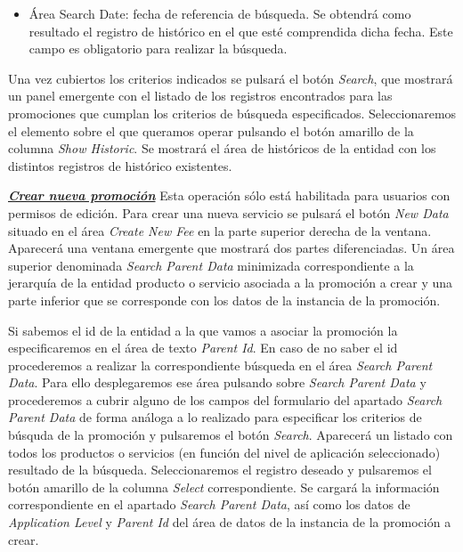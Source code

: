 \begin{itemize}
\begin{itemize}
	\end{itemize}	    	
	\item Área Search Date: fecha de referencia de búsqueda. Se obtendrá como resultado el registro de histórico en el que esté comprendida dicha fecha. Este campo es obligatorio para realizar la búsqueda.
\end{itemize}

Una vez cubiertos los criterios indicados se pulsará el botón \emph{Search}, que mostrará un panel emergente con el listado de los registros encontrados para las promociones que cumplan los criterios de búsqueda especificados. Seleccionaremos el elemento sobre el que queramos operar pulsando el botón amarillo de la columna \emph{Show Historic}. Se mostrará el área de históricos de la entidad con los distintos registros de histórico existentes.


\underline{\textsl{\textbf{Crear nueva promoción}}}\newline
Esta operación sólo está habilitada para usuarios con permisos de edición.
Para crear una nueva servicio se pulsará el botón \textit{New Data} situado en el área \emph{Create New Fee} en la parte superior derecha de la ventana. Aparecerá una ventana emergente que mostrará dos partes diferenciadas. Un área superior denominada \emph{Search Parent Data} minimizada correspondiente a la jerarquía de la entidad producto o servicio asociada a la promoción a crear y una parte inferior que se corresponde con los datos de la instancia de la promoción.

Si sabemos el id de la entidad a la que vamos a asociar la promoción la especificaremos en el área de texto \emph{Parent Id}. En caso de no saber el id procederemos a realizar la correspondiente búsqueda en el área  \emph{Search Parent Data}. Para ello desplegaremos ese área pulsando sobre \emph{Search Parent Data} y procederemos a cubrir alguno de los campos del formulario del apartado \emph{Search Parent Data} de forma análoga a lo realizado para especificar los criterios de búsquda de la promoción y pulsaremos el botón \emph{Search}. Aparecerá un listado con todos los productos o servicios (en función del nivel de aplicación seleccionado) resultado de la búsqueda. Seleccionaremos el registro deseado y pulsaremos el botón amarillo de la columna \emph{Select} correspondiente. Se cargará la información correspondiente en el apartado \emph{Search Parent Data}, así como los datos de \emph{Application Level} y \emph{Parent Id} del área de datos de la instancia de la promoción a crear.

